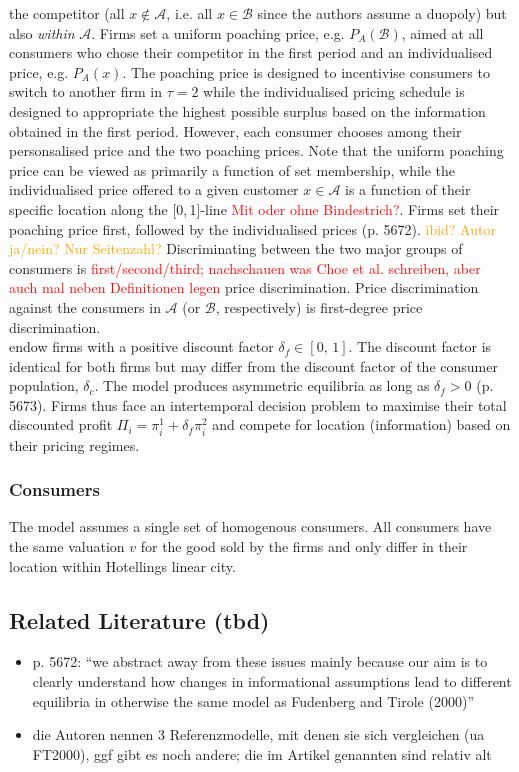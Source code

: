 \documentclass[a4paper, 11 pt, fleqn]{article}
\begin{document}
the competitor (all $x\notin\mathscr{A}$, i.e. all $x\in\mathscr{B}$ since the authors assume a duopoly) but also \textit{within} $\mathscr{A}$.
Firms set a uniform poaching price, e.g. $P_A(\mathscr{B})$, aimed at all consumers who chose their competitor in the first period and an
individualised price, e.g. $P_A(x)$. The poaching price is designed to incentivise consumers to switch to another firm in $\tau=2$ while the
individualised pricing schedule is designed to appropriate the highest possible surplus based on the information obtained in the first period.
However, each consumer chooses among their personsalised price and the two poaching prices. Note that the uniform poaching price can be viewed
as primarily a function of set membership, while the individualised price offered to a given customer $x\in\mathscr{A}$ is a function of their
specific location along the [0,\,1]-line \textcolor{red}{Mit oder ohne Bindestrich?}.
Firms set their poaching price first, followed by the individualised prices (p. 5672). \textcolor{orange}{ibid? Autor ja/nein? Nur Seitenzahl?}
Discriminating between the two major groups of consumers is \textcolor{red}{first/second/third; nachschauen was Choe et al. schreiben, aber auch mal neben Definitionen legen}
price discrimination. Price discrimination against the consumers in $\mathscr{A}$ (or $\mathscr{B}$, respectively) is first-degree price discrimination. \\
\citet[p. 5672]{Choe.2018} endow firms with a positive discount factor $\delta_f \in [0,\,1]$. The discount factor is identical for both
firms but may differ from the discount factor of the consumer population, $\delta_c$. The model produces asymmetric equilibria as long as
$\delta_f > 0$ (p. 5673). Firms thus face an intertemporal decision problem to maximise their total discounted profit
$\Pi_i = \pi^1_i + \delta_f\pi^2_i$ and compete for location (information) based on their pricing regimes.
%

%
\subsubsection{Consumers}
The model assumes a single set of homogenous consumers. All consumers have the same valuation $v$ for the good sold by the firms and only 
differ in their location within Hotellings linear city.
%


\subsection{Related Literature (tbd)}
\begin{itemize}
	\item p. 5672: ``we abstract away from these issues mainly because our aim is to clearly understand how changes in informational assumptions lead to different equilibria
	in otherwise the same model as Fudenberg and Tirole (2000)''
	\item die Autoren nennen 3 Referenzmodelle, mit denen sie sich vergleichen (ua FT2000), ggf gibt es noch andere; die im Artikel genannten sind relativ alt
\end{itemize}
%
\end{document}
